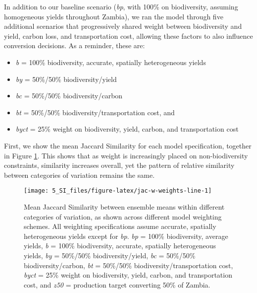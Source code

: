 \documentclass[
]{article}
\providecommand{\tightlist}{%
  \setlength{\itemsep}{0pt}\setlength{\parskip}{0pt}}
\begin{document}
In addition to our baseline scenario (\emph{bp}, with 100\% on biodiversity, assuming homogeneous yields throughout Zambia), we ran the model through five additional scenarios that progressively shared weight between biodiversity and yield, carbon loss, and transportation cost, allowing these factors to also influence conversion decisions. As a reminder, these are:

\begin{itemize}
\tightlist
\item
  \emph{b} = 100\% biodiversity, accurate, spatially heterogeneous yields
\item
  \emph{by} = 50\%/50\% biodiversity/yield
\item
  \emph{bc} = 50\%/50\% biodiversity/carbon
\item
  \emph{bt} = 50\%/50\% biodiversity/transportation cost, and
\item
  \emph{byct} = 25\% weight on biodiversity, yield, carbon, and transportation cost
\end{itemize}

First, we show the mean Jaccard Similarity for each model specification, together in Figure \ref{fig:jac-w-weights-line}. This shows that as weight is increasingly placed on non-biodiversity constraints, similarity increases overall, yet the pattern of relative similarity between categories of variation remains the same.















\begin{figure}
\texttt{[image: 5\_SI\_files/figure-latex/jac-w-weights-line-1]} \caption{Mean Jaccard Similarity between ensemble means within different categories of variation, as shown across different model weighting schemes. All weighting specifications assume accurate, spatially heterogeneous yields except for \emph{bp}. \emph{bp} = 100\% biodiversity, average yields, \emph{b} = 100\% biodiversity, accurate, spatially heterogeneous yields, \emph{by} = 50\%/50\% biodiversity/yield, \emph{bc} = 50\%/50\% biodiversity/carbon, \emph{bt} = 50\%/50\% biodiversity/transportation cost, \emph{byct} = 25\% weight on biodiversity, yield, carbon, and transportation cost, and \emph{z50} = production target converting 50\% of Zambia.}\label{fig:jac-w-weights-line}
\end{figure}
\end{document}
